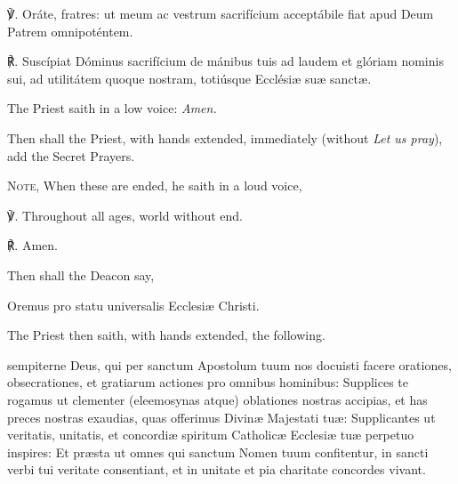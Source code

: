 ℣. Oráte, fratres: ut meum ac vestrum sacrifícium acceptábile fiat apud Deum Patrem omnipoténtem.

℟. Suscípiat Dóminus sacrifícium de mánibus tuis ad laudem et glóriam nominis sui, ad utilitátem quoque nostram, totiúsque Ecclési{\ae} su{\ae} sanct{\ae}.
\begin{rubric}
    The Priest saith in a low voice: \emph{Amen.}
\end{rubric}
\begin{rubric}
	Then shall the Priest, with hands extended, immediately (without \emph{Let us pray}), add the Secret Prayers.\par
	\textsc{Note,} When these are ended, he saith in a loud voice,
\end{rubric}
℣. Throughout all ages, world without end.\par
℟. Amen.
\begin{rubric}
    Then shall the Deacon say,
\end{rubric}
\centerline{Oremus pro statu universalis Ecclesi{\ae} Christi.}
\begin{rubric}
    The Priest then saith, with hands extended, the following.
\end{rubric}
 sempiterne Deus, qui per sanctum Apostolum tuum nos docuisti facere orationes, obsecrationes, et gratiarum actiones pro omnibus hominibus: Supplices te rogamus ut clementer (eleemosynas atque) oblationes nostras accipias, et has preces nostras exaudias, quas offerimus Divinæ Majestati tuæ: Supplicantes ut veritatis, unitatis, et concordiæ spiritum Catholicæ Ecclesiæ tuæ perpetuo inspires: Et præsta ut omnes qui sanctum Nomen tuum confitentur, in sancti verbi tui veritate consentiant, et in unitate et pia charitate concordes vivant.

